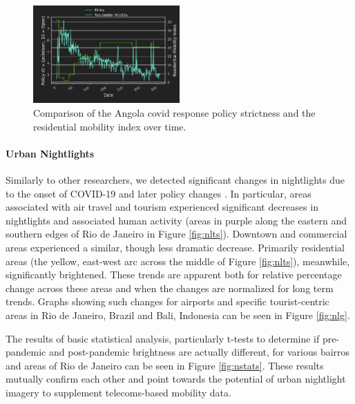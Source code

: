 \begin{figure}[!htb]
\centering
\includegraphics[width=0.5\textwidth]{Figures/chap5/Policy_nat_residential_mob.jpg}
\caption[Angola COVID-19 Policy \& Residential Mobility]{Comparison of the Angola \ac{covid} response policy strictness and the residential mobility index over time.}
\label{fig:policy-residential-mob}
\end{figure}

\paragraph{Urban Nightlights} \leavevmode\newline

Similarly to other researchers, we detected significant changes in nightlights due to the onset of COVID-19 and later policy changes \cite{elvidgeDimmingLightsChina2020, xbsdScipy2021Predicting2021}. In particular, areas associated with air travel and tourism experienced significant decreases in nightlights and associated human activity (areas in purple along the eastern and southern edges of Rio de Janeiro in Figure \ref{fig:nlts}). Downtown and commercial areas experienced a similar, though less dramatic decrease. Primarily residential areas (the yellow, east-west arc across the middle of Figure \ref{fig:nlts}), meanwhile, significantly brightened. These trends are apparent both for relative percentage change across these areas and when the changes are normalized for long term trends. Graphs showing such changes for airports and specific tourist-centric areas in Rio de Janeiro, Brazil and Bali, Indonesia can be seen in Figure \ref{fig:nlg}. 

The results of basic statistical analysis, particularly t-tests to determine if pre-pandemic and post-pandemic brightness are actually different, for various bairros and areas of Rio de Janeiro can be seen in Figure \ref{fig:nstats}. These results mutually confirm each other and point towards the potential of urban nightlight imagery to supplement telecoms-based mobility data.

